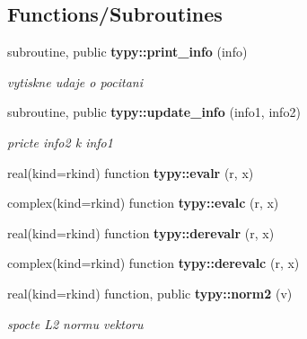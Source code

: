 \subsection*{Functions/\+Subroutines}
\begin{DoxyCompactItemize}
\item 
subroutine, public {\bf typy\+::print\+\_\+info} (info)
\begin{DoxyCompactList}\small\item\em vytiskne udaje o pocitani \end{DoxyCompactList}\item 
subroutine, public {\bf typy\+::update\+\_\+info} (info1, info2)
\begin{DoxyCompactList}\small\item\em pricte info2 k info1 \end{DoxyCompactList}\item 
real(kind=rkind) function {\bf typy\+::evalr} (r, x)
\item 
complex(kind=rkind) function {\bf typy\+::evalc} (r, x)
\item 
real(kind=rkind) function {\bf typy\+::derevalr} (r, x)
\item 
complex(kind=rkind) function {\bf typy\+::derevalc} (r, x)
\item 
real(kind=rkind) function, public {\bf typy\+::norm2} (v)
\begin{DoxyCompactList}\small\item\em spocte L2 normu vektoru \end{DoxyCompactList}\end{DoxyCompactItemize}
